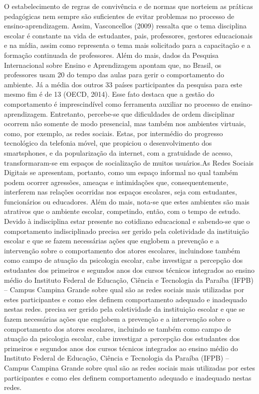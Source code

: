 
O estabelecimento de regras de convivência e de normas que norteiem as práticas pedagógicas nem sempre são suficientes de evitar problemas no processo de ensino-aprendizagem. Assim, Vasconcellos (2009) ressalta que o tema disciplina escolar é constante na vida de estudantes, pais, professores, gestores educacionais e na mídia, assim como representa o tema mais solicitado para a capacitação e a formação continuada de professores. Além do mais, dados da Pesquisa Internacional sobre Ensino e Aprendizagem apontam que, no Brasil, os professores usam 20 do tempo das aulas para gerir o comportamento do ambiente. Já a média dos outros 33 países participantes da pesquisa para este mesmo fim é de 13 (OECD, 2014). Esse fato destaca que a gestão do comportamento é imprescindível como ferramenta auxiliar no processo
de ensino-aprendizagem. Entretanto, percebe-se que dificuldades de ordem disciplinar ocorrem não somente de modo presencial, mas também nos ambientes virtuais, como, por exemplo, as redes sociais. Estas, por intermédio do progresso tecnológico da telefonia móvel, que propiciou o desenvolvimento dos smartsphones, e da popularização da internet, com a gratuidade de acesso, transformaram-se em espaços de socialização de muitos usuários.As Redes Sociais Digitais se apresentam, portanto, como um espaço informal no qual também podem ocorrer agressões, ameaças e intimidações que, consequentemente, interferem nas relações ocorridas nos espaços escolares, seja com estudantes, funcionários ou educadores. Além do mais, nota-se que estes ambientes são mais atrativos que o ambiente escolar, competindo, então, com o tempo de estudo. Devido à indisciplina estar presente no cotidiano educacional e sabendo-se que o comportamento indisciplinado precisa ser gerido pela coletividade da instituição escolar e que se fazem necessárias ações que englobem a prevenção e a intervenção sobre o comportamento dos atores escolares, incluindose também como campo de atuação da psicologia escolar, cabe investigar a percepção dos estudantes dos primeiros e segundos anos dos cursos técnicos integrados ao ensino médio do Instituto Federal de Educação, Ciência e Tecnologia da Paraíba (IFPB) – Campus Campina Grande sobre qual são as redes sociais mais utilizadas por estes participantes e como eles definem comportamento adequado e inadequado nestas redes.
precisa ser gerido pela coletividade da instituição escolar e que se fazem necessárias ações que englobem a prevenção e a intervenção sobre o comportamento dos atores escolares, incluindo se também como campo de atuação da psicologia escolar, cabe investigar a percepção dos estudantes dos primeiros e segundos anos dos cursos técnicos integrados ao ensino médio do Instituto Federal de Educação, Ciência e Tecnologia da Paraíba (IFPB) – Campus Campina Grande  sobre qual são as redes sociais mais utilizadas por estes participantes e como  eles definem comportamento adequado e inadequado nestas redes.
